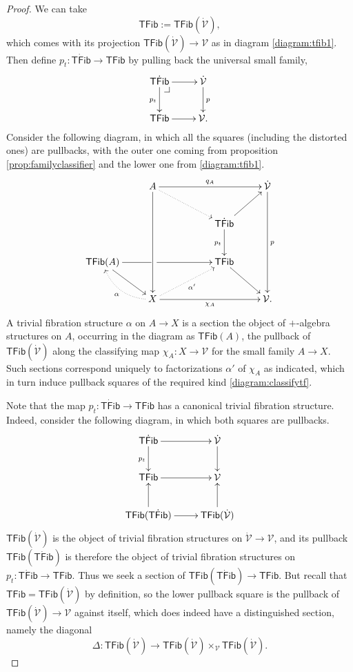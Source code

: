 \documentclass[11pt,reqno]{amsart}
\makeatletter
\newcommand{\ra}{\ensuremath{\rightarrow}}
\renewcommand{\to}{\ensuremath{\rightarrow}}
\newcommand{\V}{\ensuremath{\mathcal{V}}}
\newcommand{\VV}{\ensuremath{\dot{\mathcal{V}}}}
\newcommand{\TFib}{\ensuremath{\mathsf{TFib}}}
\newcommand{\TTFib}{\ensuremath{\dot{\mathsf{TFib}}}}
\theoremstyle{remark}
\theoremstyle{definition}
\newcommand{\pbcorner}[1][dr]{\save*!/#1-1.2pc/#1:(-1,1)@^{|-}\restore}
\makeatother
\begin{document}
\begin{proof}
We can take 
\[
\TFib := \TFib(\VV),
\]
 which comes with its projection $\TFib(\VV) \ra \V$ as in diagram \eqref{diagram:tfib1}.  Then define $p_t:\TTFib\ra\TFib$ by pulling back the universal small family,
\[
\xymatrix{
\TTFib \ar[d]_{p_t} \ar[r]  \pbcorner & \VV\ar[d]^p\\
\TFib \ar[r] & \V.
}
\]
Consider the following diagram, in which all the squares (including the distorted ones) are pullbacks, with the outer one coming from proposition \ref{prop:familyclassifier} and the lower one from \eqref{diagram:tfib1}.
%
\begin{equation}\label{diagram:classifytf2}
\xymatrix{
&A \ar[ddd] \ar[rrr]^{q_A}   \ar@{.>}[rrd] &&& \VV\ar[ddd]^p\\
& && \TTFib \ar[d]_{p_t} \ar[ru]  &\\
\TFib(A) \ar[rd] \ar[rrr] |<<<<<<<<<<<<\hole  &&& \TFib \ar[rd] &\\
&X \ar[rrr]_{\chi_A} \ar@{.>}@/^1pc/[lu]^\alpha \ar@{.>}[rru]_{\alpha'} &&& \V.
}
\end{equation}
A trivial fibration structure $\alpha$ on $A\ra X$ is a section the object of $+$-algebra structures on $A$, occurring in the diagram as $\TFib(A)$, the pullback of $\TFib(\VV)$ along the classifying map $\chi_A : X \to \V$ for the small family $A\to X$.  Such sections correspond uniquely to factorizations $\alpha'$ of $\chi_A$ as indicated, which in turn induce pullback squares of the required kind \eqref{diagram:classifytf}.

Note that the map $p_t : \TTFib\ra\TFib$ has a canonical trivial fibration structure. Indeed, consider the following diagram, in which both squares are pullbacks.
\begin{equation}\label{diagram:fibisfib}
\xymatrix{
\TTFib \ar[d]_{p_t} \ar[r]  & \VV \ar[d]\\
\TFib \ar[r] & \V\\
\TFib(\TTFib) \ar[u] \ar[r] & \TFib(\VV)\ar[u].
}
\end{equation}
$\TFib(\VV)$ is the object of trivial fibration structures on $\VV\ra\V$, and its pullback $\TFib(\TTFib)$ is therefore the object of trivial fibration structures on $p_t : \TTFib\ra\TFib$.  Thus we seek a section of $\TFib(\TTFib) \ra \TFib$.  But recall that $\TFib = \TFib(\VV)$ by definition, so the lower pullback square is the pullback of $\TFib(\VV)\ra \V$ against itself, which does indeed have a distinguished section, namely the diagonal
\[
\Delta : \TFib(\VV) \ra \TFib(\VV)\times_\V\TFib(\VV).
\]
\end{proof}
\end{document}
